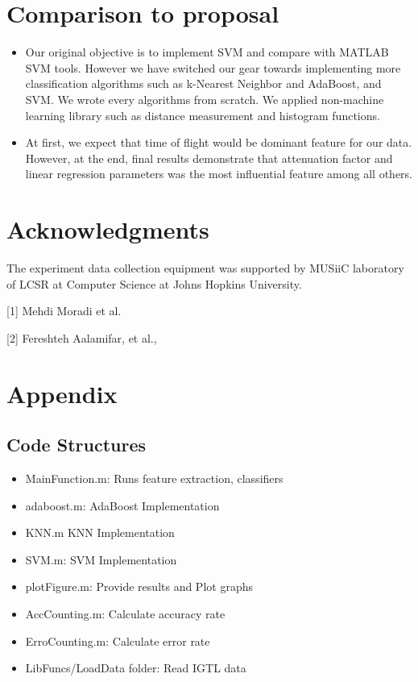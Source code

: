 \documentclass[11pt,letterpaper]{article}
\begin{document}
\section{Comparison to proposal}

\begin{itemize}
  \item Our original objective is to implement SVM and compare with MATLAB SVM tools. However we have switched our gear towards implementing more classification algorithms such as k-Nearest Neighbor and AdaBoost, and SVM. We wrote every algorithms from scratch. We applied non-machine learning library such as distance measurement and histogram functions.  
  \item At first, we expect that time of flight would be dominant feature for our data. However, at the end, final results demonstrate that attenuation factor and linear regression parameters was the most influential feature among all others. 
  
\end{itemize}

\section*{Acknowledgments}
The experiment data collection equipment was supported by MUSiiC laboratory of LCSR at Computer Science at Johns Hopkins University.

\begin{thebibliography}{2}

[1] Mehdi Moradi et al.

[2] Fereshteh Aalamifar, et al.,


\end{thebibliography}

\newpage
\section{Appendix}
\subsection{Code Structures}
	\begin{itemize}
	\item MainFunction.m: Runs feature extraction, classifiers
	\item adaboost.m: AdaBoost Implementation
	\item KNN.m  KNN Implementation
	\item SVM.m: SVM Implementation
	\item plotFigure.m: Provide results and Plot graphs
	\item AccCounting.m: Calculate accuracy rate
	\item ErroCounting.m: Calculate error rate
	\item LibFuncs/LoadData folder: Read IGTL data
	\end{itemize}
\end{document}
